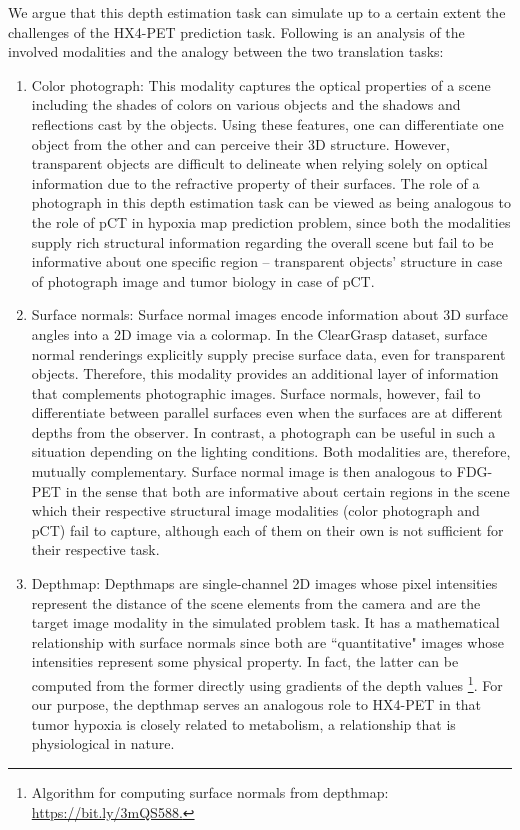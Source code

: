We argue that this depth estimation task can simulate up to a certain extent the challenges of the HX4-PET prediction task. Following is an analysis of the involved modalities and the analogy between the two translation tasks:
 
\begin{enumerate}
    
    \item Color photograph: This modality captures the optical properties of a scene including the shades of colors on various objects and the shadows and reflections cast by the objects. Using these features, one can differentiate one object from the other and can perceive their 3D structure. However, transparent objects are difficult to delineate when relying solely on optical information due to the refractive property of their surfaces. The role of a photograph in this depth estimation task can be viewed as being analogous to the role of pCT in hypoxia map prediction problem, since both the modalities supply rich structural information regarding the overall scene but fail to be informative about one specific region -- transparent objects' structure in case of photograph image and tumor biology in case of pCT.
    
    \item Surface normals: Surface normal images encode information about 3D surface angles into a 2D image via a colormap. In the ClearGrasp dataset, surface normal renderings explicitly supply precise surface data, even for transparent objects. Therefore, this modality provides an additional layer of information that complements photographic images. Surface normals, however, fail to differentiate between parallel surfaces even when the surfaces are at different depths from the observer. In contrast, a photograph can be useful in such a situation depending on the lighting conditions. Both modalities are, therefore, mutually complementary. Surface normal image is then analogous to FDG-PET in the sense that both are informative about certain regions in the scene which their respective structural image modalities (color photograph and pCT) fail to capture, although each of them on their own is not sufficient for their respective task. 
    
    \item Depthmap: Depthmaps are single-channel 2D images whose pixel intensities represent the distance of the scene elements from the camera and are the target image modality in the simulated problem task. It has a mathematical relationship with surface normals since both are ``quantitative" images whose intensities represent some physical property. In fact, the latter can be computed from the former directly using gradients of the depth values \footnote{Algorithm for computing surface normals from depthmap: \url{https://bit.ly/3mQS588.}}. For our purpose, the depthmap serves an analogous role to HX4-PET in that tumor hypoxia is closely related to metabolism, a relationship that is physiological in nature.
    
\end{enumerate}


